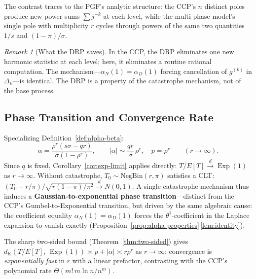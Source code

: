 \documentclass[11pt]{article}
\theoremstyle{plain}
\theoremstyle{definition}
\theoremstyle{remark}
\newtheorem{remark}[theorem]{Remark}
\DeclareMathOperator{\Exp}{Exp}
\newcommand{\dK}{d_{\mathrm{K}}}
\begin{document}
The contrast traces to the PGF's analytic structure: the CCP's $n$ distinct poles produce new power sums $\sum j^{-k}$ at each level, while the multi-phase model's single pole with multiplicity $r$ cycles through powers of the same two quantities $1/s$ and $(1-\pi)/\sigma$.

\begin{remark}[What the DRP saves]\label{rem:mp-saving}
In the CCP, the DRP eliminates one new harmonic statistic at each level; here, it eliminates a routine rational computation.  The mechanism---$\alpha_N(1) = \alpha_D(1)$ forcing cancellation of $g^{(k)}$ in $\Delta_k$---is identical.  The DRP is a property of the catastrophe mechanism, not of the base process.
\end{remark}


\subsection{Phase Transition and Convergence Rate}\label{sec:mp-transition}

Specializing Definition~\ref{def:alpha-beta}:
\begin{equation}\label{eq:mp-alpha}
  \alpha = \frac{\rho^r(s\sigma - qr)}{\sigma(1-\rho^r)}, \qquad |\alpha| \sim \frac{qr}{\sigma}\,\rho^r, \quad p = \rho^r \qquad (r \to \infty).
\end{equation}
Since $q$ is fixed, Corollary~\ref{cor:exp-limit} applies directly: $T/E[T] \xrightarrow{d} \Exp(1)$ as $r \to \infty$.  Without catastrophe, $T_0 \sim \mathrm{NegBin}(r, \pi)$ satisfies a CLT: $(T_0 - r/\pi)/\sqrt{r(1-\pi)/\pi^2} \xrightarrow{d} N(0,1)$.  A single catastrophe mechanism thus induces a \textbf{Gaussian-to-exponential phase transition}---distinct from the CCP's Gumbel-to-Exponential transition, but driven by the same algebraic cause: the coefficient equality $\alpha_N(1) = \alpha_D(1)$ forces the $\theta^1$-coefficient in the Laplace expansion to vanish exactly (Proposition~\ref{prop:alpha-properties}\,\eqref{lem:identity}).

The sharp two-sided bound (Theorem~\ref{thm:two-sided}) gives $\dK(T/E[T],\, \Exp(1)) \asymp p + |\alpha| \asymp r\rho^r$ as $r \to \infty$: convergence is \emph{exponentially fast} in $r$ with a linear prefactor, contrasting with the CCP's polynomial rate $\Theta(m!\,m\ln n/n^m)$.
\end{document}
